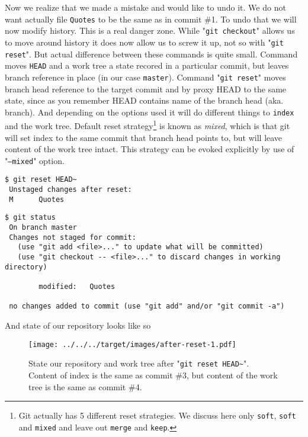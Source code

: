 \documentclass{article}
\theoremstyle{definition}
\begin{document}
        Now we realize that we made a mistake and would like to undo it. We do not want actually file \texttt{Quotes} to
        be the same as in commit \#1. To undo that we will now modify history. This is a real danger zone.
        While "\texttt{git checkout}" allows us to move around history it does now allow us to screw it up, not so
        with "\texttt{git reset}". But actual difference between these commands is quite small.
        Command  moves \texttt{HEAD} and a work tree a state recored in a particular commit, but
        leaves branch reference in place (in our case \texttt{master}). Command "\texttt{git reset}" moves branch head
        reference to the target commit and by proxy HEAD to the same state, since as you remember HEAD contains name of
        the branch head (aka. branch). And depending on the options used it will do different things to \texttt{index}
        and the work tree. Default reset strategy\footnote{Git actually has 5 different reset strategies. We discuss
          here only \texttt{soft}, \texttt{soft} and \texttt{mixed} and leave out \texttt{merge} and \texttt{keep}.}
        is known as {\em mixed}, which is that git will set index to the same commit that branch head points to, but
        will leave content of the work tree intact. This strategy can be evoked explicitly by use of "\texttt{--mixed}"
        option.

        \begin{Verbatim}[frame=single]
 $ git reset HEAD~
 Unstaged changes after reset:
 M      Quotes
        \end{Verbatim}
        \newpage
        \begin{Verbatim}[frame=single]
 $ git status
 On branch master
 Changes not staged for commit:
   (use "git add <file>..." to update what will be committed)
   (use "git checkout -- <file>..." to discard changes in working directory)

        modified:   Quotes

 no changes added to commit (use "git add" and/or "git commit -a")
        \end{Verbatim}
        And state of our repository looks like so

        \begin{figure}[h]
        \centering\texttt{[image: ../../../target/images/after-reset-1.pdf]}
        \caption{State our repository and work tree after "\texttt{git reset HEAD\textasciitilde}". Content of index is
          the same as commit \#3, but content of the work tree is the same as commit \#4.\label{fig:after-reset-one}}
        \end{figure}
\end{document}
